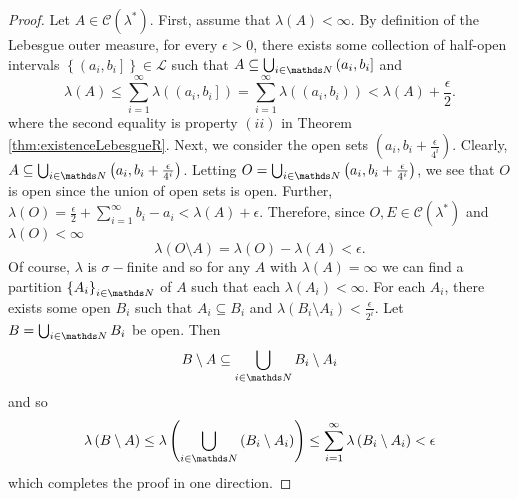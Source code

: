\begin{proof}
Let $A\in\mathcal{C}\left(\lambda^{*}\right)$. First, assume that
$\lambda\left(A\right)<\infty.$ By definition of the Lebesgue outer
measure, for every $\epsilon>0$, there exists some collection of
half-open intervals $\left\{ \left(a_{i},b_{i}\right]\right\} \in\mathcal{L}$
such that $A\subseteq\bigcup_{i\in\N}\left(a_{i},b_{i}\right]$ and
\[
\lambda\left(A\right)\leq\sum_{i=1}^{\infty}\lambda\left(\left(a_{i},b_{i}\right]\right)=\sum_{i=1}^{\infty}\lambda\left(\left(a_{i},b_{i}\right)\right)<\lambda\left(A\right)+\frac{\epsilon}{2}.
\]
where the second equality is property $\left(ii\right)$ in Theorem
\ref{thm:existenceLebesgueR}. Next, we consider the open sets $\left(a_{i},b_{i}+\frac{\epsilon}{4^{i}}\right)$.
Clearly, $A\subseteq\bigcup_{i\in\N}\left(a_{i},b_{i}+\frac{\epsilon}{4^{i}}\right)$.
Letting $O=\bigcup_{i\in\N}\left(a_{i},b_{i}+\frac{\epsilon}{4^{i}}\right)$,
we see that $O$ is open since the union of open sets is open. Further,
$\lambda\left(O\right)=\frac{\epsilon}{2}+\sum_{i=1}^{\infty}b_{i}-a_{i}<\lambda\left(A\right)+\epsilon$.
Therefore, since $O,E\in\mathcal{C}\left(\lambda^{*}\right)$ and
$\lambda\left(O\right)<\infty$
\[
\lambda\left(O\setminus A\right)=\lambda\left(O\right)-\lambda\left(A\right)<\epsilon.
\]
 Of course, $\lambda$ is $\sigma-$finite and so for any $A$ with
$\lambda\left(A\right)=\infty$ we can find a partition $\left\{ A_{i}\right\} _{i\in\N}$
of $A$ such that each $\lambda\left(A_{i}\right)<\infty$. For each
$A_{i}$, there exists some open $B_{i}$ such that $A_{i}\subseteq B_{i}$
and $\lambda\left(B_{i}\setminus A_{i}\right)<\frac{\epsilon}{2^{i}}$.
Let $B=\bigcup_{i\in\N}B_{i}$ be open. Then
\[
B\setminus A\subseteq\bigcup_{i\in\N}B_{i}\setminus A_{i}
\]
and so 
\[
\lambda\left(B\setminus A\right)\leq\lambda\left(\bigcup_{i\in\N}\left(B_{i}\setminus A_{i}\right)\right)\leq\sum_{i=1}^{\infty}\lambda\left(B_{i}\setminus A_{i}\right)<\epsilon
\]
which completes the proof in one direction.


\end{proof}
